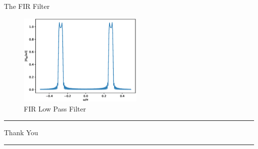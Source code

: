 \documentclass{beamer}
\begin{document}
\begin{frame}{The FIR Filter}

\begin{figure}
    \centering
    \includegraphics[width=6cm]{figs/FIR_bandpass.eps}
    \caption{FIR Low Pass Filter}
\end{figure}

\noindent
{ \rule{\linewidth}{0.5mm} }
\Huge{\centerline{Thank You}}
\noindent
{ \rule{\linewidth}{0.5mm} }
\end{frame}
\end{document}
